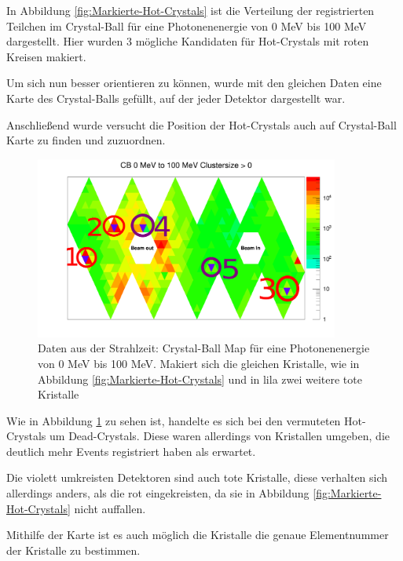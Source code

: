 \documentclass[a4paper,11pt,oneside,final,german,openbib,pdftex]{scrbook}
\begin{document}
{In Abbildung \ref{fig:Markierte-Hot-Crystals} ist die Verteilung der registrierten Teilchen im Crystal-Ball f\"ur eine Photonenenergie von 0 MeV bis 100 MeV dargestellt. Hier wurden 3 m\"ogliche Kandidaten f\"ur Hot-Crystals mit roten Kreisen makiert. 


Um sich nun besser orientieren zu k\"onnen, wurde mit den gleichen Daten eine Karte des Crystal-Balls gef\"ullt, auf der jeder Detektor dargestellt war.


Anschlie{\ss}end wurde versucht die Position der Hot-Crystals auch auf Crystal-Ball Karte zu finden und zuzuordnen.




\begin{figure}[h!]
	\begin{center}
		\includegraphics[width=100mm]{NewCalib/Strahlzeit2014/ClusterSizeNew/20172404Clustersize0Map100MeV}
		\caption[Strahlzeit: Markierte Dead-Crystals auf der CB-Karte; Niedrige Energien]{Daten aus der Strahlzeit: Crystal-Ball Map f\"ur eine Photonenenergie von 0 MeV bis 100 MeV. Makiert sich die gleichen Kristalle, wie in Abbildung \ref{fig:Markierte-Hot-Crystals} und in lila zwei weitere tote Kristalle}
		\label{fig:Makierte-Kristalle-Map}
	\end{center}
\end{figure}

Wie in Abbildung \ref{fig:Makierte-Kristalle-Map} zu sehen ist, handelte es sich bei den vermuteten Hot-Crystals um Dead-Crystals. Diese waren allerdings von Kristallen umgeben, die deutlich mehr Events registriert haben als erwartet.

Die violett umkreisten Detektoren sind auch tote Kristalle, diese verhalten sich allerdings anders, als die rot eingekreisten, da sie in Abbildung \ref{fig:Markierte-Hot-Crystals} nicht auffallen.

Mithilfe der Karte ist es auch m\"oglich die Kristalle die genaue Elementnummer der Kristalle zu bestimmen.

}
\end{document}
